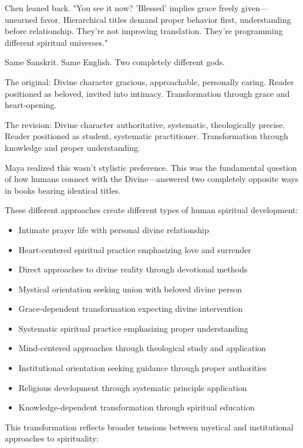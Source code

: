 \documentclass[12pt,twoside]{book}
\begin{document}
Chen leaned back. "You see it now? 'Blessed' implies grace freely given—unearned favor. Hierarchical titles demand proper behavior first, understanding before relationship. They're not improving translation. They're programming different spiritual universes."

Same Sanskrit. Same English. Two completely different gods.

The original: Divine character gracious, approachable, personally caring. Reader positioned as beloved, invited into intimacy. Transformation through grace and heart-opening.

The revision: Divine character authoritative, systematic, theologically precise. Reader positioned as student, systematic practitioner. Transformation through knowledge and proper understanding.

Maya realized this wasn't stylistic preference. This was the fundamental question of how humans connect with the Divine—answered two completely opposite ways in books bearing identical titles.

These different approaches create different types of human spiritual development:

\begin{itemize}
\item Intimate prayer life with personal divine relationship
\item Heart-centered spiritual practice emphasizing love and surrender
\item Direct approaches to divine reality through devotional methods
\item Mystical orientation seeking union with beloved divine person
\item Grace-dependent transformation expecting divine intervention

\item Systematic spiritual practice emphasizing proper understanding
\item Mind-centered approaches through theological study and application
\item Institutional orientation seeking guidance through proper authorities
\item Religious development through systematic principle application
\item Knowledge-dependent transformation through spiritual education
\end{itemize}

This transformation reflects broader tensions between mystical and institutional approaches to spirituality:
\end{document}
